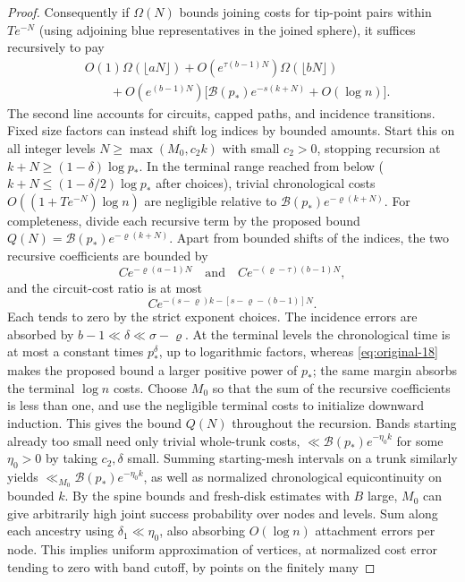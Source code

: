\begin{proof}
Consequently if \(\Omega(N)\) bounds joining costs for tip-point pairs within \(T e^{-N}\)
(using adjoining blue representatives in the joined sphere), it suffices recursively to
pay
\[
 \begin{aligned}
 &O(1)\Omega(\lfloor aN\rfloor)
   +O(e^{\tau(b-1)N})\Omega(\lfloor bN\rfloor)\\
 &\qquad+O(e^{(b-1)N})
       \bigl[\mathcal B(p_*)e^{-s(k+N)}+O(\log n)\bigr].
 \end{aligned}
\]
The second line accounts for circuits, capped paths, and incidence
transitions. Fixed size factors can instead shift log indices by bounded amounts. Start
this on all integer levels \(N\ge\max(M_0,c_2 k)\) with small \(c_2>0\), stopping
recursion at \(k+N\ge(1-\delta)\log p_*\). In the terminal range reached from below
(\(k+N\le(1-\delta/2)\log p_*\) after choices), trivial chronological costs
\(O((1+T e^{-N})\log n)\) are negligible relative to \(\mathcal B(p_*)e^{-\varrho(k+N)}\).
For completeness, divide each recursive term by the proposed bound
\(Q(N)=\mathcal B(p_*)e^{-\varrho(k+N)}\). Apart from bounded shifts of the indices,
the two recursive coefficients are bounded by
\[
 C e^{-\varrho(a-1)N}
 \quad\text{and}\quad
 C e^{-(\varrho-\tau)(b-1)N},
\]
and the circuit-cost ratio is at most
\[
 C e^{-(s-\varrho)k-[s-\varrho-(b-1)]N}.
\]
Each tends to zero by the strict exponent choices. The incidence errors are
absorbed by \(b-1\ll\delta\ll\sigma-\varrho\). At the terminal levels the
chronological time is at most a constant times \(p_*^\delta\), up to logarithmic
factors, whereas \eqref{eq:original-18} makes the proposed bound a larger
positive power of \(p_*\); the same margin absorbs the terminal \(\log n\) costs.
Choose \(M_0\) so that the sum of the recursive coefficients is less than one,
and use the negligible terminal costs to initialize downward induction. This
gives the bound \(Q(N)\) throughout the recursion. Bands starting
already too small need only trivial whole-trunk costs, \(\ll\mathcal B(p_*)e^{-\eta_0 k}\)
for some \(\eta_0>0\) by taking \(c_2,\delta\) small. Summing starting-mesh intervals on a
trunk similarly yields \(\ll_{M_0}\mathcal B(p_*)e^{-\eta_0 k}\), as well as normalized
chronological equicontinuity on bounded \(k\). By the spine bounds and fresh-disk
estimates with \(B\) large, \(M_0\) can give arbitrarily high joint success probability
over nodes and levels. Sum along each ancestry using \(\delta_1\ll\eta_0\), also absorbing
\(O(\log n)\) attachment errors per node. This implies uniform approximation of vertices,
at normalized cost error tending to zero with band cutoff, by points on the finitely many

\end{proof}
